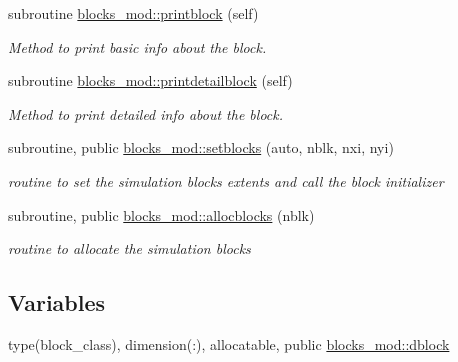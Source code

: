 \begin{DoxyCompactItemize}
subroutine \mbox{\hyperlink{namespaceblocks__mod_a6eab8b323cb15dcecb5c6b0c31b4e246}{blocks\+\_\+mod\+::printblock}} (self)
\begin{DoxyCompactList}\small\item\em Method to print basic info about the block. \end{DoxyCompactList}\item 
subroutine \mbox{\hyperlink{namespaceblocks__mod_a10f356706988c45a255922fe70851488}{blocks\+\_\+mod\+::printdetailblock}} (self)
\begin{DoxyCompactList}\small\item\em Method to print detailed info about the block. \end{DoxyCompactList}\item 
subroutine, public \mbox{\hyperlink{namespaceblocks__mod_a8f5a5d9e6cfd16cfd1b179092a204696}{blocks\+\_\+mod\+::setblocks}} (auto, nblk, nxi, nyi)
\begin{DoxyCompactList}\small\item\em routine to set the simulation blocks extents and call the block initializer \end{DoxyCompactList}\item 
subroutine, public \mbox{\hyperlink{namespaceblocks__mod_a639beb0fee2290d46353f4b4702d6711}{blocks\+\_\+mod\+::allocblocks}} (nblk)
\begin{DoxyCompactList}\small\item\em routine to allocate the simulation blocks \end{DoxyCompactList}\end{DoxyCompactItemize}
\subsection*{Variables}
\begin{DoxyCompactItemize}
\item 
type(block\+\_\+class), dimension(\+:), allocatable, public \mbox{\hyperlink{namespaceblocks__mod_ac8ad6e3cf7a812f95dadb592336aca50}{blocks\+\_\+mod\+::dblock}}
\end{DoxyCompactItemize}
